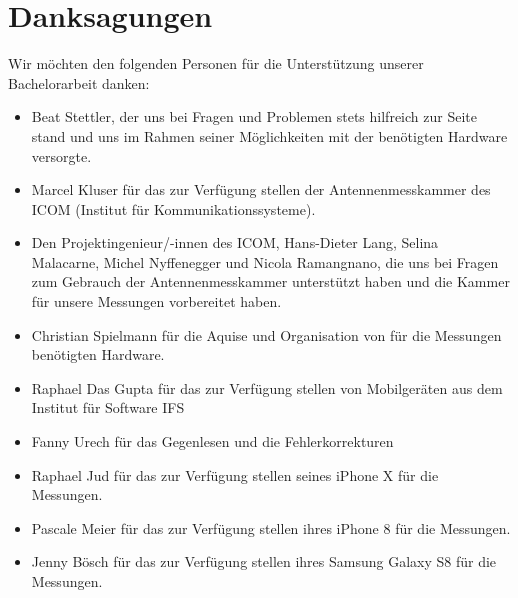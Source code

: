 \cleardoublepage

\section*{Danksagungen}

Wir möchten den folgenden Personen für die Unterstützung unserer Bachelorarbeit
danken:

\begin{itemize}
	\item Beat Stettler, der uns bei Fragen und Problemen stets hilfreich 
	zur Seite stand und uns im Rahmen seiner Möglichkeiten mit der benötigten
	Hardware versorgte.
	\item Marcel Kluser für das zur Verfügung stellen der Antennenmesskammer
	des ICOM (Institut für Kommunikationssysteme).
	\item Den Projektingenieur/-innen des ICOM, Hans-Dieter Lang, Selina \\
	Malacarne, Michel Nyffenegger und Nicola Ramangnano, 
	die uns bei Fragen zum Gebrauch der Antennenmesskammer unterstützt 
	haben und die Kammer für unsere Messungen vorbereitet haben.
	\item Christian Spielmann für die Aquise und Organisation von für die 
	Messungen benötigten Hardware.
	\item Raphael Das Gupta für das zur Verfügung stellen von Mobilgeräten aus 
	dem Institut für Software IFS
	\item Fanny Urech für das Gegenlesen und die Fehlerkorrekturen
	\item Raphael Jud für das zur Verfügung stellen seines iPhone X für die 
	Messungen.
	\item Pascale Meier für das zur Verfügung stellen ihres iPhone 8 für die 
	Messungen.
	\item Jenny Bösch für das zur Verfügung stellen ihres Samsung Galaxy S8 für 
	die Messungen.
\end{itemize}